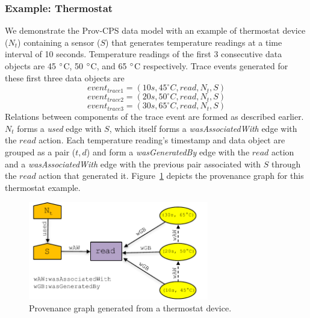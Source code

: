 \subsubsection{Example: Thermostat}
 
We demonstrate the Prov-CPS data model with an example of thermostat device ($N_t$) containing a sensor ($S$) that generates temperature readings at a time interval of 10 seconds. Temperature readings of the first 3 consecutive data objects are 45 $\degree$C, 50 $\degree$C, and 65 $\degree$C respectively. Trace events generated for these first three data objects are
\[event_{trace1} = (10 s, 45 ^{\circ}C, read, N_t, S)\]  
\[event_{trace2} = (20 s, 50 ^{\circ}C, read, N_t, S)\]  
\[event_{trace3} = (30 s, 65 ^{\circ}C, read, N_t, S)\]
Relations between components of the trace event are formed as described earlier. $N_t$ forms a \textit{used} edge with $S$, which itself forms a \textit{wasAssociatedWith} edge with the $read$ action. Each temperature reading's timestamp and data object are grouped as a pair ($t, d$) and form a \textit{wasGeneratedBy} edge with the $read$ action and a \textit{wasAssociatedWith} edge with the previous pair associated with $S$ through the $read$ action that generated it. Figure~\ref{prov_sensor} depicts the provenance graph for this thermostat example.




\begin{figure}[tb!]
\begin{center}

\includegraphics[width=0.7\textwidth]{prov_sensor_v3.pdf}
\end{center}
\caption{Provenance graph generated from a thermostat device.}
\label{prov_sensor}
\end{figure}



